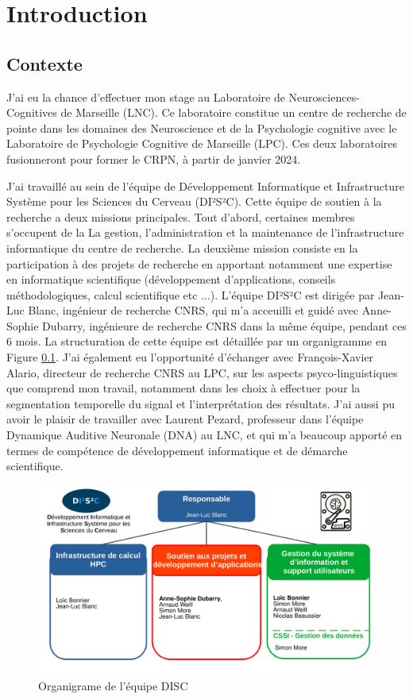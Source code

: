 \chapter*{Introduction}
\section{Contexte}

J'ai eu la chance d'effectuer mon stage au Laboratoire de Neurosciences-Cognitives de Marseille (LNC). Ce laboratoire constitue un centre de recherche de pointe dans les domaines des Neuroscience et de la Psychologie cognitive avec le Laboratoire de Psychologie Cognitive de Marseille (LPC). Ces deux laboratoires fusionneront pour former le CRPN, à partir de janvier 2024.

\vspace{2ex}
J'ai travaillé au sein de l'équipe de Développement Informatique et Infrastructure Système pour les Sciences du Cerveau (DI²S²C). Cette équipe de soutien à la recherche a deux missions principales. Tout d'abord, certaines membres s'occupent de la La gestion, l'administration et la maintenance de l’infrastructure informatique du centre de recherche. La deuxième mission consiste en la participation à des projets de recherche en apportant notamment une expertise en informatique scientifique (développement d'applications, conseils méthodologiques, calcul scientifique etc ...). L'équipe DI²S²C est dirigée par Jean-Luc Blanc, ingénieur de recherche CNRS, qui m'a acceuilli et guidé avec Anne-Sophie Dubarry, ingénieure de recherche CNRS dans la même équipe, pendant ces 6 mois. La structuration de cette équipe est détaillée par un organigramme en Figure \ref{fig0.1}. J'ai également eu l'opportunité d'échanger avec François-Xavier Alario, directeur de recherche CNRS au LPC, sur les aspects psyco-linguistiques que comprend mon travail, notamment dans les choix à effectuer pour la segmentation temporelle du signal et l'interprétation des résultats. J'ai aussi pu avoir le plaisir de travailler avec Laurent Pezard, professeur dans l'équipe Dynamique Auditive Neuronale (DNA) au LNC, et qui m'a beaucoup apporté en termes de compétence de développement informatique et de démarche scientifique.

\begin{figure}[!ht]
    \centering
    \includegraphics[width=13cm]{OrganigrameDISC.png}
    \caption{Organigrame de l'équipe DISC}
    \label{fig0.1}
\end{figure} 

